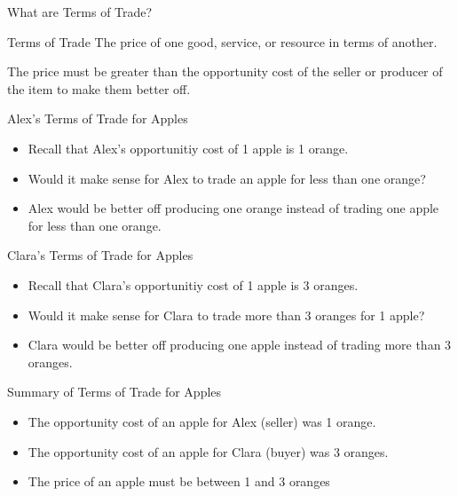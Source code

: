 \documentclass{beamer}
\begin{document}
\begin{frame}{What are Terms of Trade?}

\begin{block}{Terms of Trade}
The price of one good, service, or resource in terms of another.
\end{block}

The price must be greater than the opportunity cost of the seller or producer of the item to make them better off.

\end{frame}

\begin{frame}{Alex's Terms of Trade for Apples}

\begin{exampleblock}

\begin{itemize}
\item Recall that Alex's opportunitiy cost of 1 apple is 1 orange.
\item Would it make sense for Alex to trade an apple for less than one orange? 
\item Alex would be better off producing one orange instead of trading one apple for less than one orange.
\end{itemize}

\end{exampleblock}

\end{frame}

\begin{frame}{Clara's Terms of Trade for Apples}

\begin{exampleblock}

\begin{itemize}
\item Recall that Clara's opportunitiy cost of 1 apple is 3 oranges.
\item Would it make sense for Clara to trade more than 3 oranges for 1 apple? 
\item Clara would be better off producing one apple instead of trading more than 3 oranges.
\end{itemize}
\end{exampleblock}

\end{frame}

\begin{frame}{Summary of Terms of Trade for Apples}

\begin{exampleblock}

\begin{itemize}
\item The opportunity cost of an apple for Alex (seller) was 1 orange.
\item The opportunity cost of an apple for Clara (buyer) was 3 oranges.
\item The price of an apple must be between 1 and 3 oranges
\end{itemize}
\end{exampleblock}

\end{frame}
\end{document}
